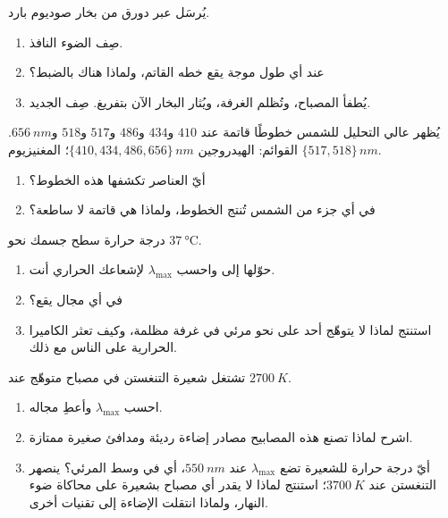 \begin{exercise}[$\star\star$]\label{exo:g10:light-spectra:9}
يُرسَل  عبر دورق من بخار صوديوم بارد.
\begin{enumerate}
  \item صِف  الضوء النافذ.
  \item عند أي طول موجة يقع خطه القاتم، ولماذا هناك
        بالضبط؟
  \item يُطفأ المصباح، وتُظلم الغرفة، ويُثار البخار
        الآن بتفريغ. صِف  الجديد.
\end{enumerate}
\end{exercise}

\begin{exercise}[$\star\star$]\label{exo:g10:light-spectra:10}
يُظهر  عالي التحليل للشمس خطوطًا قاتمة عند $410$ و$434$
و$486$ و$517$ و$518$ و$\qty{656}{nm}$. القوائم: الهيدروجين
$\{410, 434, 486, 656\}\,\unit{nm}$؛ المغنيزيوم $\{517, 518\}\,\unit{nm}$.
\begin{enumerate}
  \item أيّ العناصر تكشفها هذه الخطوط؟
  \item في أي جزء من الشمس تُنتج الخطوط، ولماذا هي
        قاتمة لا ساطعة؟
\end{enumerate}
\end{exercise}

\begin{exercise}[$\star\star$]\label{exo:g10:light-spectra:11}
درجة حرارة سطح جسمك نحو $\qty{37}{\degreeCelsius}$.
\begin{enumerate}
  \item حوّلها إلى  واحسب $\lambda_{\max}$ لإشعاعك
        الحراري أنت.
  \item في أي مجال يقع؟
  \item استنتج لماذا لا يتوهّج أحد على نحو مرئي في غرفة مظلمة، وكيف
        تعثر الكاميرا الحرارية على الناس مع ذلك.
\end{enumerate}
\end{exercise}

\begin{exercise}[$\star\star\star$]\label{exo:g10:light-spectra:12}
تشتغل شعيرة التنغستن في مصباح متوهّج عند $\qty{2700}{K}$.
\begin{enumerate}
  \item احسب $\lambda_{\max}$ وأعطِ مجاله.
  \item اشرح لماذا تصنع هذه المصابيح مصادر إضاءة رديئة ومدافئ
        صغيرة ممتازة.
  \item أيّ درجة حرارة للشعيرة تضع $\lambda_{\max}$ عند
        $\qty{550}{nm}$، أي في وسط المرئي؟ ينصهر التنغستن عند
        $\qty{3700}{K}$؛ استنتج لماذا لا يقدر أي مصباح بشعيرة على محاكاة
        ضوء النهار، ولماذا انتقلت الإضاءة إلى تقنيات أخرى.
\end{enumerate}
\end{exercise}

